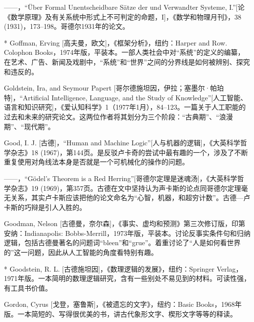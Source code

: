 \begin{thebib}
\begin{biblist}
\item ——，“Über Formal Unentscheidbare Sätze der  und Verwandter Systeme, I.”[论《数学原理》及有关系统中形式上不可判定的命题，I]，《数学和物理月刊》，38 (1931)，173--198。哥德尔1931年的论文。

\item[*] Goffman, Erving [高夫曼，欧文]，《框架分析》，纽约：Harper and Row. Colophon Books，1974年版，平装本。一部人类社会中对“系统”的定义的编纂，在艺术、广告、新闻及戏剧中，“系统”和“世界”之间的分界线是如何被辨别、探究和违反的。

\item Goldstein, Ira, and Seymour Papert [哥尔德施坦因，伊拉；塞墨尔·帕珀特]，“Artificial Intelligence, Language, and the Study of Knowledge”[人工智能、语言和知识研究]，《爱认知科学》1（1977年1月），84--123。一篇关于人工职能的过去和未来的研究论文。这两位作者将其划分为三个阶段：“古典期”、“浪漫期”、“现代期”。

\item Good, I. J. [古德]，“Human and Machine Logic”[人与机器的逻辑]，《大英科学哲学杂志》18 (1967)，第144页。是反驳卢卡奇的尝试中最有趣的一个，涉及了不断重复使用对角线法本身是否就是一个可机械化的操作的问题。

\item ——，“Gödel's Theorem is a Red Herring”[哥德尔定理是迷魂汤]，《大英科学哲学杂志》19 (1969)，第357页。古德在文中坚持认为声卡斯的论点同哥德尔定理毫无关系，其实卢卡斯应该把他的论文命名为“心智，机器，和超穷计数”。古德—卢卡斯的巧辩是引人入胜的。

\item Goodman, Nelson [古德曼，奈尔森]，《事实、虚均和预测》第三次修订版，印第安纳：Indianapolis: Bobbs-Merrill，1973年版，平装本。讨论反事实条件句和归纳逻辑，包括古德曼著名的问题词“bleen”和“grue”。着重讨论了“人是如何看世界的”这一问题，因此从人工智能的角度看特别有趣。

\item[*] Goodstein, R. L. [古德施坦因]，《数理逻辑的发展》，纽约：Springer Verlag，1971年版。一本简明的数理逻辑研究，含有一些别处不易见到的材料。可读性强，有工具书价值。

\item Gordon, Cyrus [戈登，塞鲁斯]，《被遗忘的文字》，纽约：Basic Books，1968年版。一本简短的、写得很优美的书，讲古代象形文字、楔形文字等等的释读。


\end{biblist}
\end{thebib}
